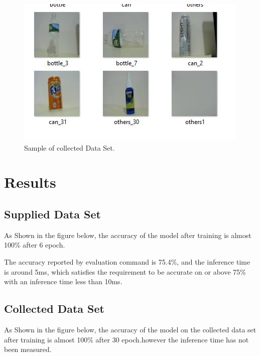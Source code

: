 \documentclass[10pt,journal,compsoc]{IEEEtran}
\begin{document}
\begin{figure}[thpb]
      \centering
      \includegraphics[width=\linewidth]{collected}
      \caption{Sample of collected Data Set.}
      \label{fig:sample of collected Data Set}
\end{figure}

\section{Results}
\subsection{Supplied Data Set}
As Shown in the figure below, the accuracy of the model after training is almost 100\% after 6 epoch.

The accuracy reported by evaluation command is 75.4\%, and the inference time is  around 5ms, which satisfies the requirement to be accurate on or above 75\% with an inference time less than 10ms.

\subsection{Collected Data Set}
As Shown in the figure below, the accuracy of the model on the collected data set after training is almost 100\% after 30 epoch.however the inference time has not been measured.
\end{document}
